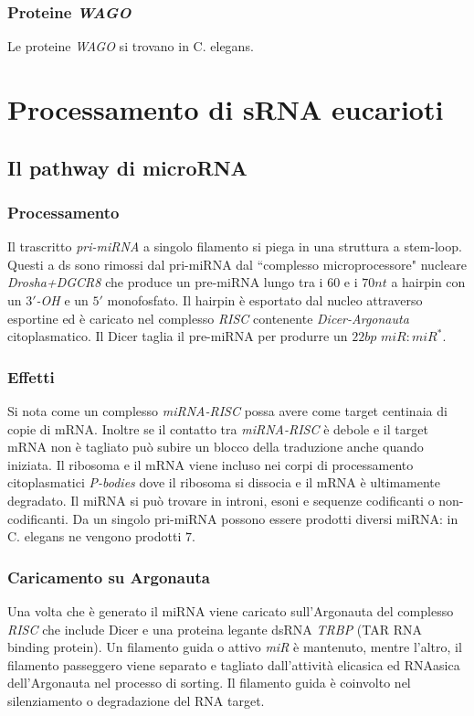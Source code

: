 \subsubsection{Proteine \emph{WAGO}}
Le proteine \emph{WAGO} si trovano in C. elegans.
\section{Processamento di sRNA eucarioti}
\subsection{Il pathway di microRNA}
\subsubsection{Processamento}
Il trascritto \emph{pri-miRNA} a singolo filamento si piega in una struttura a stem-loop. Questi a ds sono rimossi dal pri-miRNA dal ``complesso microprocessore" nucleare 
\emph{Drosha+DGCR8} che produce un pre-miRNA lungo tra i $60$ e i $70nt$ a hairpin con un \emph{$3'$-OH} e un $5'$ monofosfato. Il hairpin \`e esportato dal nucleo attraverso esportine
ed \`e caricato nel complesso \emph{RISC} contenente \emph{Dicer-Argonauta} citoplasmatico. Il Dicer taglia il pre-miRNA per produrre un $22bp$ \emph{$miR:miR^*$}. 
\subsubsection{Effetti}
Si nota come un complesso \emph{miRNA-RISC} possa avere come target centinaia di copie di mRNA. Inoltre se il contatto tra \emph{miRNA-RISC} \`e debole e il target mRNA non \`e tagliato 
pu\`o subire un blocco della traduzione anche quando iniziata. Il ribosoma e il mRNA viene incluso nei corpi di processamento citoplasmatici \emph{P-bodies} dove il ribosoma si dissocia 
e il mRNA \`e ultimamente degradato. Il miRNA si pu\`o trovare in introni, esoni e sequenze codificanti o non-codificanti. Da un singolo pri-miRNA possono essere prodotti diversi miRNA: 
in C. elegans ne vengono prodotti $7$. 
\subsubsection{Caricamento su Argonauta}
Una volta che \`e generato il miRNA viene caricato sull'Argonauta del complesso \emph{RISC} che include Dicer e una proteina legante dsRNA \emph{TRBP} (TAR RNA binding protein). Un
filamento guida o attivo \emph{miR} \`e mantenuto, mentre l'altro, il filamento passeggero viene separato e tagliato dall'attivit\`a elicasica ed RNAasica dell'Argonauta  nel processo
di sorting. Il filamento guida \`e coinvolto nel silenziamento o degradazione del RNA target. 
